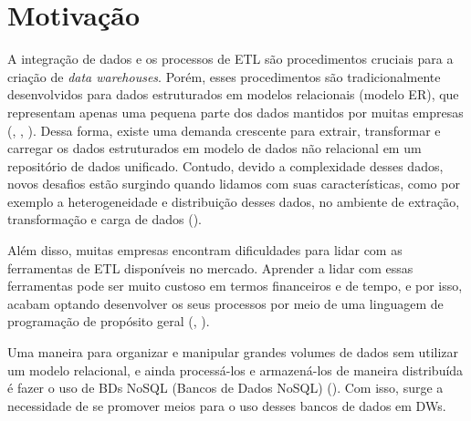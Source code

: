 \section{Motivação}

A integração de dados e os processos de ETL são procedimentos cruciais para a criação de \textit{data warehouses}. Porém, esses procedimentos são tradicionalmente desenvolvidos para dados estruturados em modelos relacionais (modelo ER), que representam apenas uma pequena parte dos dados mantidos por muitas empresas (\cite{darmont:2005}, \cite{russom:2007}, \cite{thomsen:2009}). Dessa forma, existe uma demanda crescente para extrair, transformar e carregar os dados estruturados em modelo de dados não relacional em um repositório de dados unificado. Contudo, devido a complexidade desses dados, novos desafios estão surgindo quando lidamos com suas características, como por exemplo a heterogeneidade e distribuição desses dados, no ambiente de extração, transformação e carga de dados (\cite{salem:2012}).

Além disso, muitas empresas encontram dificuldades para lidar com as ferramentas de ETL disponíveis no mercado. Aprender a lidar com essas ferramentas pode ser muito custoso em termos financeiros e de tempo, e por isso, acabam optando desenvolver os seus processos por meio de uma linguagem de programação de propósito geral (\cite{awad:2011}, \cite{munoz:2009}).


Uma maneira para organizar e manipular grandes volumes de dados sem utilizar um modelo relacional, e ainda processá-los e armazená-los de maneira distribuída é fazer o uso de BDs NoSQL (Bancos de Dados NoSQL) (\cite{scabora:2016}). Com isso, surge a necessidade de se promover meios para o uso desses bancos de dados em DWs. 

